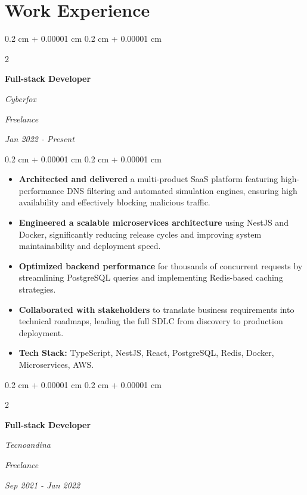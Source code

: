 \documentclass[10pt, letterpaper]{article}
\newenvironment{highlights}{
    \begin{itemize}[
        topsep=0.10 cm,
        parsep=0.10 cm,
        partopsep=0pt,
        itemsep=0pt,
        leftmargin=0.4 cm + 10pt
    ]
}{
    \end{itemize}
} %
\newenvironment{onecolentry}{
    \begin{adjustwidth}{
        0.2 cm + 0.00001 cm
    }{
        0.2 cm + 0.00001 cm
    }
}{
    \end{adjustwidth}
} %
\newenvironment{twocolentry}[2][]{
    \onecolentry
    \def\secondColumn{#2}
    \setcolumnwidth{\fill, 4.5 cm}
    \begin{paracol}{2}
}{
    \switchcolumn \raggedleft \secondColumn
    \end{paracol}
    \endonecolentry
} %
\begin{document}
        \vspace{0.2 cm}


    
    \section{Work Experience}

        \begin{twocolentry}{
        \textit{Freelance}

        \textit{Jan 2022 - Present}}
            \textbf{Full-stack Developer }
            
            \textit{Cyberfox}
        \end{twocolentry}


        \vspace{0.10 cm}
        \begin{onecolentry}
            \begin{highlights}
                \item \textbf{Architected and delivered} a multi-product SaaS platform featuring high-performance DNS filtering and automated simulation engines, ensuring high availability and effectively blocking malicious traffic.
                \item \textbf{Engineered a scalable microservices architecture} using NestJS and Docker, significantly reducing release cycles and improving system maintainability and deployment speed.
                \item \textbf{Optimized backend performance} for thousands of concurrent requests by streamlining PostgreSQL queries and implementing Redis-based caching strategies.
                \item \textbf{Collaborated with stakeholders} to translate business requirements into technical roadmaps, leading the full SDLC from discovery to production deployment.
                \item \textbf{Tech Stack:} TypeScript, NestJS, React, PostgreSQL, Redis, Docker, Microservices, AWS.
            \end{highlights}
        \end{onecolentry}


        \vspace{0.2 cm}

        \begin{twocolentry}{
        \textit{Freelance}

        \textit{Sep 2021 - Jan 2022}}
            \textbf{Full-stack Developer}

            \textit{Tecnoandina}
        \end{twocolentry}
\end{document}
